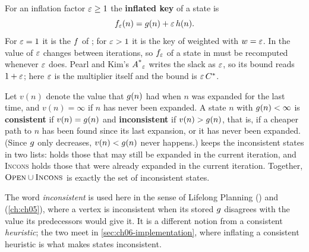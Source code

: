 \begin{definition}
\label{def:ch06-key}
For an inflation factor $\varepsilon \ge 1$ the \textbf{inflated
key} of a state is
\begin{equation}
  f_\varepsilon(n) = g(n) + \varepsilon\,h(n).
  \label{eq:ch06-key}
\end{equation}
For $\varepsilon = 1$ it is the $f$ of \astar; for $\varepsilon > 1$ it is the key of
weighted \astar with $w = \varepsilon$. In \arastar the value of $\varepsilon$ changes between
iterations, so $f_\varepsilon$ of a state in \Open must be recomputed whenever
$\varepsilon$ does. Pearl and Kim's $A\textsuperscript{*}_\varepsilon$ \cite{pearl1982studies} writes the
slack as $\varepsilon$, so its bound reads $1 + \varepsilon$; here $\varepsilon$ is the multiplier
itself and the bound is $\varepsilon\,C^*$.
\end{definition}

\begin{definition}
\label{def:ch06-inconsistent}
Let $v(n)$ denote the value that $g(n)$ had when $n$ was expanded for the
last time, and $v(n) = \infty$ if $n$ has never been expanded. A state $n$ with
$g(n) < \infty$ is \textbf{consistent} if $v(n) = g(n)$ and
\textbf{inconsistent} if $v(n) > g(n)$, that is,
if a cheaper path to $n$ has been found since its last expansion, or it has
never been expanded. (Since $g$ only decreases, $v(n) < g(n)$ never
happens.) \arastar keeps the inconsistent states in two lists:
\Open{} holds those that may still be expanded in the current
iteration, and \textsc{Incons} holds those that were
already expanded in the current iteration. Together, $\textsc{Open} \cup
\textsc{Incons}$ is exactly the set of inconsistent states.
\end{definition}

The word \emph{inconsistent} is used here in the sense of Lifelong
Planning \astar (\lpastar) and \dstarlite (\cref{ch:ch05}), where a vertex is inconsistent when its stored
$g$ disagrees with the value its predecessors would give it. It is a
different notion from a consistent \emph{heuristic}; the two meet in
\cref{sec:ch06-implementation}, where inflating a consistent heuristic is what
makes states inconsistent.

